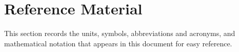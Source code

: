 \section{Reference Material}

This section records the units, symbols, abbreviations and acronyms, and 
mathematical notation that appears in this document for easy reference.







